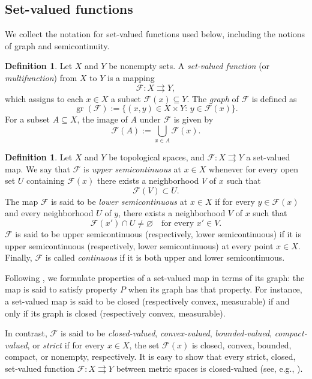 \documentclass[11pt]{elsarticle}
\theoremstyle{definition}
\newtheorem{definition}[theorem]{Definition}
\theoremstyle{remark}
\numberwithin{equation}{section}
\def\gr{\operatorname{gr}}
\begin{document}
	\subsection{Set-valued functions}
	
	We collect the notation for set-valued functions used below, including the
	notions of graph and semicontinuity.
	
	\begin{definition}
		Let $X$ and $Y$ be nonempty sets. A \emph{set-valued function} (or \emph{multifunction}) from $X$ to $Y$ is a mapping
		\[
		\mathcal{F}:X \rightrightarrows Y,
		\]
		which assigns to each $x\in X$ a subset $\mathcal{F}(x)\subseteq Y$. The \emph{graph} of $\mathcal{F}$ is defined as
		\[
		\gr(\mathcal{F}):=\{(x,y)\in X\times Y:\, y\in \mathcal{F}(x)\}.
		\]
		For a subset $A\subseteq X$, the image of $A$ under $\mathcal{F}$ is given by
		\[
		\mathcal{F}(A):=\bigcup_{x\in A}\mathcal{F}(x).
		\]
	\end{definition}
	
	
	\begin{definition}
		Let $X$ and $Y$ be topological spaces, and
		$\mathcal{F}:X\rightrightarrows Y$ a set-valued map.
		We say that $\mathcal{F}$ is \emph{upper semicontinuous} at $x\in X$ whenever for every open set
		$U$ containing $\mathcal{F}(x)$ there exists a neighborhood $V$ of $x$ such that
		\[
		\mathcal{F}(V)\subset U.
		\]
		The map $\mathcal{F}$ is said to be \emph{lower semicontinuous} at $x\in X$
		if for every $y\in \mathcal{F}(x)$ and every neighborhood $U$ of $y$, there exists a neighborhood $V$ of $x$ such that
		\[
		\mathcal{F}(x') \cap U \neq \varnothing \quad \text{for every } x' \in V.
		\] 
		$\mathcal{F}$ is said to be upper semicontinuous (respectively, lower semicontinuous) if it is upper semicontinuous (respectively, lower semicontinuous) at every point $x\in X$. 
		Finally, $\mathcal{F}$ is called \emph{continuous} if it is both upper and
		lower semicontinuous.
	\end{definition}
	
	
	Following \cite{aubin_frankowska_2009}, we formulate properties of a set-valued map in terms of its graph: the map is said to satisfy property $P$ when its graph has that property.
	For instance, a set-valued map is said to be closed (respectively convex, measurable) if and only if its graph is closed (respectively convex, measurable).
	
	
	
	In contrast, $\mathcal{F}$ is said to be \emph{closed-valued}, \emph{convex-valued}, \emph{bounded-valued}, \emph{compact-valued}, or \emph{strict} if for every $x\in X$, the set \(\mathcal{F}(x)\) is closed, convex, bounded, compact, or nonempty, respectively.
%
It is easy to show that every strict, closed, set-valued function 
$\mathcal{F}:X\rightrightarrows Y$ between metric spaces is closed-valued
(see, e.g., \cite[p.\,22]{BGMO1986}).
		
\end{document}
